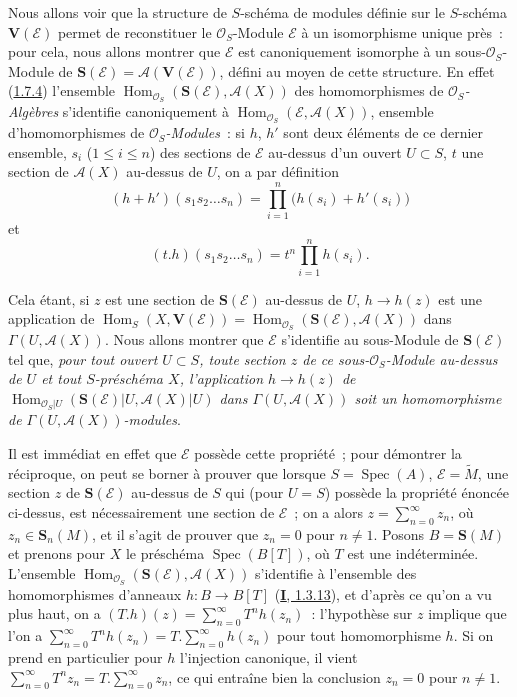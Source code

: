 \begin{env}[1.7.14]
\label{II.1.7.14-fr}
Nous allons voir que la structure de $S$-schéma de modules définie sur le
$S$-schéma $\mathbf{V}(\mathcal{E})$ permet de reconstituer le
$\mathcal{O}_S$-Module $\mathcal{E}$ à un isomorphisme unique près~: pour
cela, nous allons montrer que $\mathcal{E}$ est canoniquement isomorphe à un
sous-$\mathcal{O}_S$-Module de
$\mathbf{S}(\mathcal{E})=\mathcal{A}(\mathbf{V}(\mathcal{E}))$, défini au
moyen de cette structure. En effet
(\hyperref[II.1.7.4-fr]{1.7.4}) l'ensemble
$\operatorname{Hom}_{\mathcal{O}_S}(\mathbf{S}(\mathcal{E}),
\mathcal{A}(X))$ des homomorphismes de
\emph{$\mathcal{O}_S$-Algèbres} s'identifie canoniquement à
$\operatorname{Hom}_{\mathcal{O}_S}(\mathcal{E},\mathcal{A}(X))$, ensemble
d'homomorphismes de \emph{$\mathcal{O}_S$-Modules}~: si $h$, $h'$ sont deux
éléments de ce dernier ensemble, $s_i$ ($1\leq i\leq n$) des sections de
$\mathcal{E}$ au-dessus d'un ouvert $U\subset S$, $t$ une section de
$\mathcal{A}(X)$ au-dessus de $U$, on a par définition
\[
  (h+h')(s_1s_2\ldots s_n)
  =\prod_{i=1}^n\bigl(h(s_i)+h'(s_i)\bigr)
\]
et
\[
  (t.h)(s_1s_2\ldots s_n)=t^n\prod_{i=1}^n h(s_i).
\]

Cela étant, si $z$ est une section de $\mathbf{S}(\mathcal{E})$ au-dessus
de $U$, $h\to h(z)$ est une application de
$\operatorname{Hom}_S(X,\mathbf{V}(\mathcal{E}))
=\operatorname{Hom}_{\mathcal{O}_S}(\mathbf{S}(\mathcal{E}),
\mathcal{A}(X))$ dans $\Gamma(U,\mathcal{A}(X))$. Nous allons
montrer que $\mathcal{E}$ s'identifie au sous-Module de
$\mathbf{S}(\mathcal{E})$ tel que, \emph{pour tout ouvert $U\subset S$,
toute section $z$ de ce sous-$\mathcal{O}_S$-Module au-dessus de $U$ et tout
$S$-préschéma $X$, l'application $h\to h(z)$ de
$\operatorname{Hom}_{\mathcal{O}_S|U}(\mathbf{S}(\mathcal{E})|U,
\mathcal{A}(X)|U)$ dans $\Gamma(U,\mathcal{A}(X))$ soit un homomorphisme de
$\Gamma(U,\mathcal{A}(X))$-modules}.

Il est immédiat en effet que $\mathcal{E}$ possède cette propriété~; pour
démontrer la réciproque, on peut se borner à prouver que lorsque
$S=\operatorname{Spec}(A)$, $\mathcal{E}=\widetilde{M}$, une section $z$ de
$\mathbf{S}(\mathcal{E})$ au-dessus de $S$ qui (pour $U=S$) possède la
propriété énoncée ci-dessus, est nécessairement une section de
$\mathcal{E}$~; on a alors $z=\sum_{n=0}^{\infty}z_n$, où
$z_n\in\mathbf{S}_n(M)$, et il s'agit de prouver que $z_n=0$ pour $n\ne1$.
Posons $B=\mathbf{S}(M)$ et prenons pour $X$ le préschéma
$\operatorname{Spec}(B[T])$, où $T$ est une indéterminée. L'ensemble
$\operatorname{Hom}_{\mathcal{O}_S}(\mathbf{S}(\mathcal{E}),
\mathcal{A}(X))$ s'identifie à l'ensemble des homomorphismes d'anneaux
$h:B\to B[T]$ (\hyperref[I.1.3.13-fr]{\textbf{I}, 1.3.13}), et d'après ce qu'on a vu
plus haut, on a
$(T.h)(z)=\sum_{n=0}^{\infty}T^nh(z_n)$~: l'hypothèse sur $z$ implique que
l'on a
$\sum_{n=0}^{\infty}T^nh(z_n)=T.\sum_{n=0}^{\infty}h(z_n)$ pour tout
homomorphisme $h$. Si on prend en particulier pour $h$ l'injection
canonique, il vient
$\sum_{n=0}^{\infty}T^nz_n=T.\sum_{n=0}^{\infty}z_n$, ce qui entraîne bien
la conclusion $z_n=0$ pour $n\ne1$.
\end{env}

